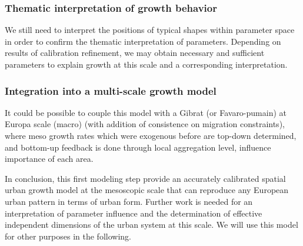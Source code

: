 \subsubsection{Thematic interpretation of growth behavior}

We still need to interpret the positions of typical shapes within parameter space in order to confirm the thematic interpretation of parameters. Depending on results of calibration refinement, we may obtain necessary and sufficient parameters to explain growth at this scale and a corresponding interpretation.

\subsubsection{Integration into a multi-scale growth model}

It could be possible to couple this model with a Gibrat (or Favaro-pumain) at Europa scale (macro) (with addition of consistence on migration constraints), where meso growth rates which were exogenous before are top-down determined, and bottom-up feedback is done through local aggregation level, influence importance of each area.





In conclusion, this first modeling step provide an accurately calibrated spatial urban growth model at the mesoscopic scale that can reproduce any European urban pattern in terms of urban form. Further work is needed for an interpretation of parameter influence and the determination of effective independent dimensions of the urban system at this scale. We will use this model for other purposes in the following.



















\newpage



